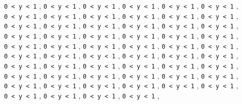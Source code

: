 \documentclass[
  ukrainian,
]{article}
\begin{document}
\texttt{0\ \textless{}\ y\ \textless{}\ 1} ,
\texttt{0\ \textless{}\ y\ \textless{}\ 1} ,
\texttt{0\ \textless{}\ y\ \textless{}\ 1} ,
\texttt{0\ \textless{}\ y\ \textless{}\ 1} ,
\texttt{0\ \textless{}\ y\ \textless{}\ 1} ,
\texttt{0\ \textless{}\ y\ \textless{}\ 1} ,
\texttt{0\ \textless{}\ y\ \textless{}\ 1} ,
\texttt{0\ \textless{}\ y\ \textless{}\ 1} ,
\texttt{0\ \textless{}\ y\ \textless{}\ 1} ,
\texttt{0\ \textless{}\ y\ \textless{}\ 1} ,
\texttt{0\ \textless{}\ y\ \textless{}\ 1} ,
\texttt{0\ \textless{}\ y\ \textless{}\ 1} ,
\texttt{0\ \textless{}\ y\ \textless{}\ 1} ,
\texttt{0\ \textless{}\ y\ \textless{}\ 1} ,
\texttt{0\ \textless{}\ y\ \textless{}\ 1} ,
\texttt{0\ \textless{}\ y\ \textless{}\ 1} ,
\texttt{0\ \textless{}\ y\ \textless{}\ 1} ,
\texttt{0\ \textless{}\ y\ \textless{}\ 1} ,
\texttt{0\ \textless{}\ y\ \textless{}\ 1} ,
\texttt{0\ \textless{}\ y\ \textless{}\ 1} ,
\texttt{0\ \textless{}\ y\ \textless{}\ 1} ,
\texttt{0\ \textless{}\ y\ \textless{}\ 1} ,
\texttt{0\ \textless{}\ y\ \textless{}\ 1} ,
\texttt{0\ \textless{}\ y\ \textless{}\ 1} ,
\texttt{0\ \textless{}\ y\ \textless{}\ 1} ,
\texttt{0\ \textless{}\ y\ \textless{}\ 1} ,
\texttt{0\ \textless{}\ y\ \textless{}\ 1} ,
\texttt{0\ \textless{}\ y\ \textless{}\ 1} ,
\texttt{0\ \textless{}\ y\ \textless{}\ 1} ,
\texttt{0\ \textless{}\ y\ \textless{}\ 1} ,
\texttt{0\ \textless{}\ y\ \textless{}\ 1} ,
\texttt{0\ \textless{}\ y\ \textless{}\ 1} ,
\texttt{0\ \textless{}\ y\ \textless{}\ 1} ,
\texttt{0\ \textless{}\ y\ \textless{}\ 1} ,
\texttt{0\ \textless{}\ y\ \textless{}\ 1} ,
\texttt{0\ \textless{}\ y\ \textless{}\ 1} ,
\texttt{0\ \textless{}\ y\ \textless{}\ 1} ,
\texttt{0\ \textless{}\ y\ \textless{}\ 1} ,
\texttt{0\ \textless{}\ y\ \textless{}\ 1} ,
\texttt{0\ \textless{}\ y\ \textless{}\ 1} ,
\texttt{0\ \textless{}\ y\ \textless{}\ 1} ,
\texttt{0\ \textless{}\ y\ \textless{}\ 1} ,
\texttt{0\ \textless{}\ y\ \textless{}\ 1} ,
\texttt{0\ \textless{}\ y\ \textless{}\ 1} ,
\texttt{0\ \textless{}\ y\ \textless{}\ 1} ,
\texttt{0\ \textless{}\ y\ \textless{}\ 1} ,
\texttt{0\ \textless{}\ y\ \textless{}\ 1} ,
\texttt{0\ \textless{}\ y\ \textless{}\ 1} ,
\texttt{0\ \textless{}\ y\ \textless{}\ 1} ,
\texttt{0\ \textless{}\ y\ \textless{}\ 1} ,
\texttt{0\ \textless{}\ y\ \textless{}\ 1} ,
\texttt{0\ \textless{}\ y\ \textless{}\ 1} ,
\texttt{0\ \textless{}\ y\ \textless{}\ 1} ,
\texttt{0\ \textless{}\ y\ \textless{}\ 1} ,
\texttt{0\ \textless{}\ y\ \textless{}\ 1} ,
\texttt{0\ \textless{}\ y\ \textless{}\ 1} ,
\texttt{0\ \textless{}\ y\ \textless{}\ 1} ,
\texttt{0\ \textless{}\ y\ \textless{}\ 1} ,
\end{document}

